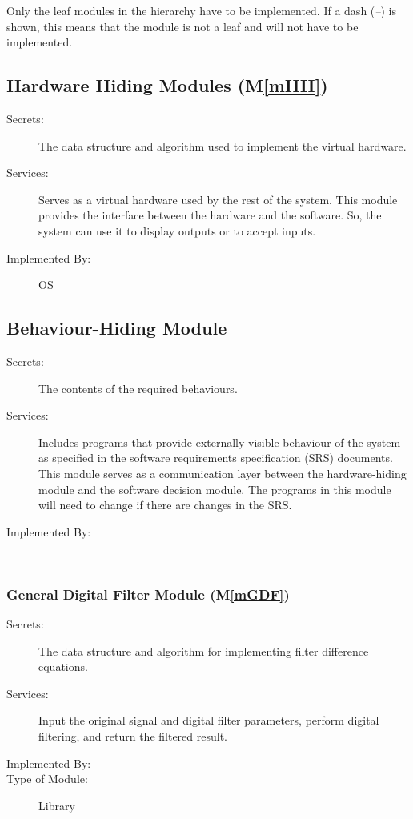 \documentclass[12pt, titlepage]{article}
\newcommand{\mref}[1]{M\ref{#1}}
\begin{document}
Only the leaf modules in the hierarchy have to be implemented. If a dash
(\emph{--}) is shown, this means that the module is not a leaf and will not have
to be implemented.

\subsection{Hardware Hiding Modules (\mref{mHH})}

\begin{description}
\item[Secrets:]The data structure and algorithm used to implement the virtual
  hardware.
\item[Services:]Serves as a virtual hardware used by the rest of the system.
  This module provides the interface between the hardware and the software. So,
  the system can use it to display outputs or to accept inputs.
\item[Implemented By:] OS
\end{description}

\subsection{Behaviour-Hiding Module}

\begin{description}
\item[Secrets:]The contents of the required behaviours.
\item[Services:]Includes programs that provide externally visible behaviour of
  the system as specified in the software requirements specification (SRS)
  documents. This module serves as a communication layer between the
  hardware-hiding module and the software decision module. The programs in this
  module will need to change if there are changes in the SRS.
\item[Implemented By:] --
\end{description}

\subsubsection{General Digital Filter Module (\mref{mGDF})}

\begin{description}
\item[Secrets:]The data structure and algorithm for implementing filter
difference equations.
\item[Services:]Input the original signal and digital filter parameters, perform
digital filtering, and return the filtered result.
\item[Implemented By:] \progname
\item[Type of Module:] Library
\end{description}
\end{document}
